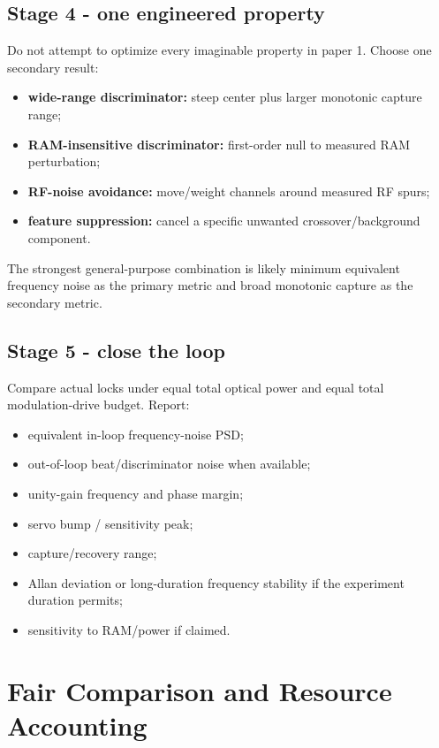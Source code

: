 \documentclass[10pt]{article}
\begin{document}
\subsection{Stage 4 - one engineered property}
Do not attempt to optimize every imaginable property in paper 1. Choose one secondary result:
\begin{itemize}
\item \textbf{wide-range discriminator:} steep center plus larger monotonic capture range;
\item \textbf{RAM-insensitive discriminator:} first-order null to measured RAM perturbation;
\item \textbf{RF-noise avoidance:} move/weight channels around measured RF spurs;
\item \textbf{feature suppression:} cancel a specific unwanted crossover/background component.
\end{itemize}
The strongest general-purpose combination is likely minimum equivalent frequency noise as the primary metric and broad monotonic capture as the secondary metric.

\subsection{Stage 5 - close the loop}
Compare actual locks under equal total optical power and equal total modulation-drive budget. Report:
\begin{itemize}
\item equivalent in-loop frequency-noise PSD;
\item out-of-loop beat/discriminator noise when available;
\item unity-gain frequency and phase margin;
\item servo bump / sensitivity peak;
\item capture/recovery range;
\item Allan deviation or long-duration frequency stability if the experiment duration permits;
\item sensitivity to RAM/power if claimed.
\end{itemize}

\section{Fair Comparison and Resource Accounting}
\end{document}
